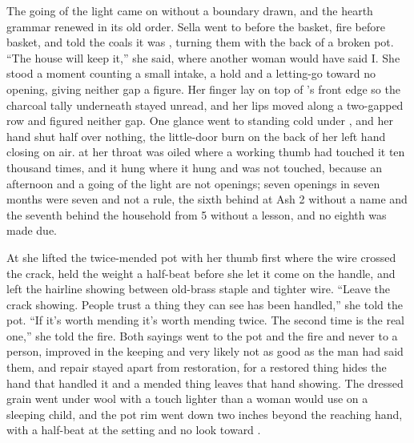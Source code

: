 The going of the light came on without a boundary drawn, and the hearth grammar renewed in its old order. Sella went to  before the basket, fire before basket, and told the coals it was , turning them with the back of a broken pot. “The house will keep it,” she said, where another woman would have said I. She stood a moment counting a small intake, a hold and a letting-go toward no opening, giving neither gap a figure. Her finger lay on top of 's front edge so the charcoal tally underneath stayed unread, and her lips moved along a two-gapped row and figured neither gap. One glance went to  standing cold under , and her hand shut half over nothing, the little-door burn on the back of her left hand closing on air.  at her throat was oiled where a working thumb had touched it ten thousand times, and it hung where it hung and was not touched, because an afternoon and a going of the light are not openings; seven openings in seven months were seven and not a rule, the sixth behind at Ash 2 without a name and the seventh behind the household from  5 without a lesson, and no eighth was made due.

At  she lifted the twice-mended pot with her thumb first where the wire crossed the crack, held the weight a half-beat before she let it come on the handle, and left the hairline showing between old-brass staple and tighter wire. “Leave the crack showing. People trust a thing they can see has been handled,” she told the pot. “If it's worth mending it's worth mending twice. The second time is the real one,” she told the fire. Both sayings went to the pot and the fire and never to a person, improved in the keeping and very likely not as good as the man had said them, and repair stayed apart from restoration, for a restored thing hides the hand that handled it and a mended thing leaves that hand showing. The dressed grain went under wool with a touch lighter than a woman would use on a sleeping child, and the pot rim went down two inches beyond the reaching hand, with a half-beat at the setting and no look toward .

